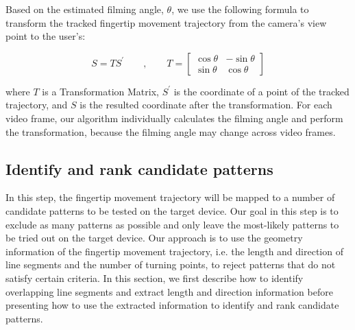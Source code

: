Based on the estimated filming angle, $\theta$, we use the following formula to transform the tracked fingertip movement trajectory from the camera's view point to the user's:

\begin{equation}
        S=TS^{'} \qquad, \qquad  T=\left[ \begin{matrix} \cos\theta & -\sin\theta \\ \sin\theta & \cos\theta \end{matrix} \right]
\end{equation}

where $T$ is a Transformation Matrix, $S^{'}$ is the coordinate of a point of the tracked trajectory, and $S$ is the resulted coordinate after the transformation.
For each video frame, our algorithm individually calculates the filming angle and perform the transformation, because the filming angle may change across video frames.


\subsection{Identify and rank candidate patterns}
\label{section:spea}
  In this step, the fingertip movement trajectory will be mapped to a number of candidate patterns to be tested on the target device.
   Our goal in this step is to exclude as many patterns as possible and only leave the most-likely patterns to be tried out on the target device.
     Our approach is to use the geometry information of the fingertip movement trajectory, i.e. the length and direction of line segments and the number of turning points, to reject patterns that do not satisfy certain criteria.
    In this section, we first describe how to identify overlapping line segments and extract length and direction information before presenting how to use the extracted information to identify and rank candidate patterns.


